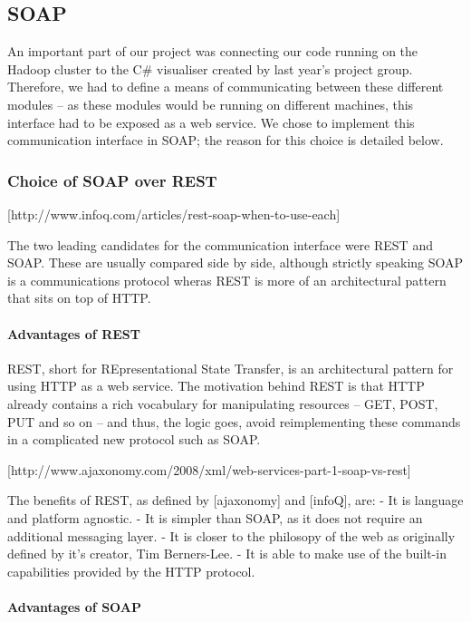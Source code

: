 \subsection{SOAP}

An important part of our project was connecting our code running on the Hadoop cluster to the C# visualiser created by last year's project group. Therefore, we had to define a means of communicating between these different modules -- as these modules would be running on different machines, this interface had to be exposed as a web service. We chose to implement this communication interface in SOAP; the reason for this choice is detailed below.

\subsubsection{Choice of SOAP over REST}

[http://www.infoq.com/articles/rest-soap-when-to-use-each]

The two leading candidates for the communication interface were REST and SOAP. These are usually compared side by side, although strictly speaking SOAP is a communications protocol wheras REST is more of an architectural pattern that sits on top of HTTP.

\paragraph{Advantages of REST}

REST, short for REpresentational State Transfer, is an architectural pattern for using HTTP as a web service. The motivation behind REST is that HTTP already contains a rich vocabulary for manipulating resources -- GET, POST, PUT and so on -- and thus, the logic goes, avoid reimplementing these commands in a complicated new protocol such as SOAP.

[http://www.ajaxonomy.com/2008/xml/web-services-part-1-soap-vs-rest]

The benefits of REST, as defined by [ajaxonomy] and [infoQ], are:
- It is language and platform agnostic.
- It is simpler than SOAP, as it does not require an additional messaging layer.
- It is closer to the philosopy of the web as originally defined by it's creator, Tim Berners-Lee.
- It is able to make use of the built-in capabilities provided by the HTTP protocol.

\paragraph{Advantages of SOAP}

